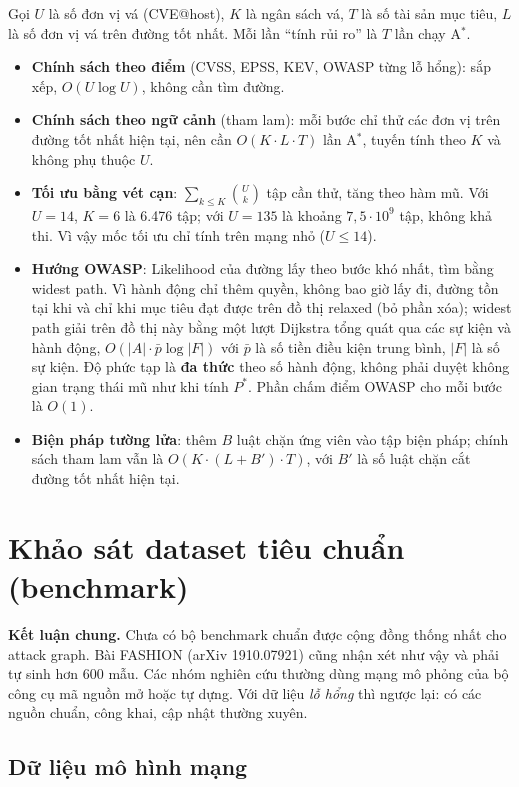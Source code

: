 \documentclass[11pt,a4paper]{article}
\begin{document}
Gọi $U$ là số đơn vị vá (CVE@host), $K$ là ngân sách vá, $T$ là số tài sản mục tiêu, $L$ là số đơn vị vá trên đường tốt nhất. Mỗi lần ``tính rủi ro'' là $T$ lần chạy A$^{*}$.
\begin{itemize}
  \item \textbf{Chính sách theo điểm} (CVSS, EPSS, KEV, OWASP từng lỗ hổng): sắp xếp, $O(U \log U)$, không cần tìm đường.
  \item \textbf{Chính sách theo ngữ cảnh} (tham lam): mỗi bước chỉ thử các đơn vị trên đường tốt nhất hiện tại, nên cần $O(K \cdot L \cdot T)$ lần A$^{*}$, tuyến tính theo $K$ và không phụ thuộc $U$.
  \item \textbf{Tối ưu bằng vét cạn}: $\sum_{k \le K} \binom{U}{k}$ tập cần thử, tăng theo hàm mũ. Với $U = 14$, $K = 6$ là 6.476 tập; với $U = 135$ là khoảng $7{,}5 \cdot 10^{9}$ tập, không khả thi. Vì vậy mốc tối ưu chỉ tính trên mạng nhỏ ($U \le 14$).
  \item \textbf{Hướng OWASP}: Likelihood của đường lấy theo bước khó nhất, tìm bằng widest path. Vì hành động chỉ thêm quyền, không bao giờ lấy đi, đường tồn tại khi và chỉ khi mục tiêu đạt được trên đồ thị relaxed (bỏ phần xóa); widest path giải trên đồ thị này bằng một lượt Dijkstra tổng quát qua các sự kiện và hành động, $O(|A| \cdot \bar{p} \log |F|)$ với $\bar{p}$ là số tiền điều kiện trung bình, $|F|$ là số sự kiện. Độ phức tạp là \textbf{đa thức} theo số hành động, không phải duyệt không gian trạng thái mũ như khi tính $P^{*}$. Phần chấm điểm OWASP cho mỗi bước là $O(1)$.
  \item \textbf{Biện pháp tường lửa}: thêm $B$ luật chặn ứng viên vào tập biện pháp; chính sách tham lam vẫn là $O(K \cdot (L + B') \cdot T)$, với $B'$ là số luật chặn cắt đường tốt nhất hiện tại.
\end{itemize}

\section{Khảo sát dataset tiêu chuẩn (benchmark)}

\textbf{Kết luận chung.} Chưa có bộ benchmark chuẩn được cộng đồng thống nhất cho attack graph. Bài FASHION (arXiv 1910.07921) cũng nhận xét như vậy và phải tự sinh hơn 600 mẫu. Các nhóm nghiên cứu thường dùng mạng mô phỏng của bộ công cụ mã nguồn mở hoặc tự dựng. Với dữ liệu \emph{lỗ hổng} thì ngược lại: có các nguồn chuẩn, công khai, cập nhật thường xuyên.

\subsection{Dữ liệu mô hình mạng}
\end{document}
